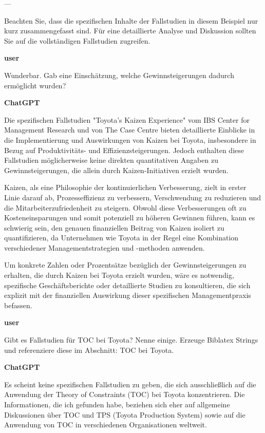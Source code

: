 ---

Beachten Sie, dass die spezifischen Inhalte der Fallstudien in diesem Beispiel nur kurz zusammengefasst sind. Für eine detaillierte Analyse und Diskussion sollten Sie auf die vollständigen Fallstudien zugreifen.

\textbf{user}

Wunderbar. Gab eine Einschätzung, welche Gewinnsteigerungen dadurch ermöglicht wurden?

\textbf{ChatGPT}

Die spezifischen Fallstudien "Toyota's Kaizen Experience" vom IBS Center for Management Research und von The Case Centre bieten detaillierte Einblicke in die Implementierung und Auswirkungen von Kaizen bei Toyota, insbesondere in Bezug auf Produktivitäts- und Effizienzsteigerungen. Jedoch enthalten diese Fallstudien möglicherweise keine direkten quantitativen Angaben zu Gewinnsteigerungen, die allein durch Kaizen-Initiativen erzielt wurden.

Kaizen, als eine Philosophie der kontinuierlichen Verbesserung, zielt in erster Linie darauf ab, Prozesseffizienz zu verbessern, Verschwendung zu reduzieren und die Mitarbeiterzufriedenheit zu steigern. Obwohl diese Verbesserungen oft zu Kosteneinsparungen und somit potenziell zu höheren Gewinnen führen, kann es schwierig sein, den genauen finanziellen Beitrag von Kaizen isoliert zu quantifizieren, da Unternehmen wie Toyota in der Regel eine Kombination verschiedener Managementstrategien und -methoden anwenden.

Um konkrete Zahlen oder Prozentsätze bezüglich der Gewinnsteigerungen zu erhalten, die durch Kaizen bei Toyota erzielt wurden, wäre es notwendig, spezifische Geschäftsberichte oder detaillierte Studien zu konsultieren, die sich explizit mit der finanziellen Auswirkung dieser spezifischen Managementpraxis befassen.

\textbf{user}

Gibt es Fallstudien für TOC bei Toyota? Nenne einige. Erzeuge Biblatex Strings und referenziere diese im Abschnitt: TOC bei Toyota.

\textbf{ChatGPT}

Es scheint keine spezifischen Fallstudien zu geben, die sich ausschließlich auf die Anwendung der Theory of Constraints (TOC) bei Toyota konzentrieren. Die Informationen, die ich gefunden habe, beziehen sich eher auf allgemeine Diskussionen über TOC und TPS (Toyota Production System) sowie auf die Anwendung von TOC in verschiedenen Organisationen weltweit. 

